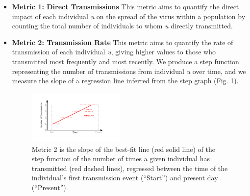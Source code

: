 \documentclass[twocolumn]{bmcart}%
\begin{document}
\begin{itemize}
\item \textbf{Metric 1: Direct Transmissions} This metric aims to quantify the direct impact of each individual \textit{u} on the spread of the virus within a population by counting the total number of individuals to whom \textit{u} directly transmitted.\\

\item \textbf{Metric 2: Transmission Rate} This metric aims to quantify the rate of transmission of each individual \textit{u}, giving higher values to those who transmitted
most frequently and 
most recently.
We produce a step function representing the number of transmissions from individual \textit{u} over time,
and we measure the slope of a regression line inferred from the step graph (Fig. 1).\\

\begin{figure}[h!]
\centering
\includegraphics[width=0.45\textwidth]{Figures/Fig1.pdf}
\caption{Metric 2 is the slope of the best-fit line (red solid line) of the step function of the number of times a given individual has transmitted (red dashed lines), regressed between the time of the individual's first transmission event (``Start'') and present day (``Present'').
}
\end{figure}


\end{itemize}
\end{document}
